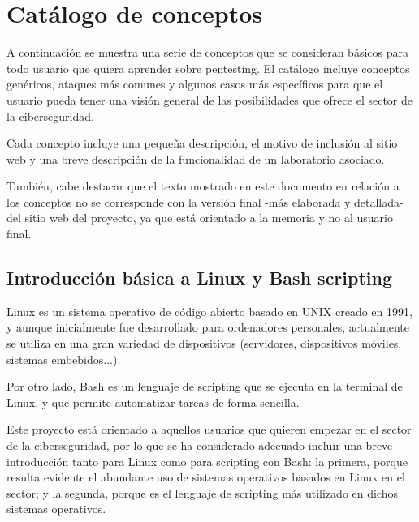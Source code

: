             \newpage
        
        
\chapter{Catálogo de conceptos}
    \label{sec:catalogo}

    A continuación se muestra una serie de conceptos que se consideran básicos para todo usuario que quiera aprender sobre pentesting. El catálogo incluye conceptos genéricos, ataques más comunes y algunos casos más específicos para que el usuario pueda tener una visión general de las posibilidades que ofrece el sector de la ciberseguridad.

    Cada concepto incluye una pequeña descripción, el motivo de inclusión al sitio web y una breve descripción de la funcionalidad de un laboratorio asociado.

    También, cabe destacar que el texto mostrado en este documento en relación a los conceptos no se corresponde con la versión final -más elaborada y detallada- del sitio web del proyecto, ya que está orientado a la memoria y no al usuario final.

    \section{Introducción básica a Linux y Bash scripting}
        \label{sec:catalogo-linux-bash}

        Linux es un sistema operativo de código abierto basado en UNIX creado en 1991, y aunque inicialmente fue desarrollado para ordenadores personales, actualmente se utiliza en una gran variedad de dispositivos (servidores, dispositivos móviles, sistemas embebidos...).

        Por otro lado, Bash es un lenguaje de scripting que se ejecuta en la terminal de Linux, y que permite automatizar tareas de forma sencilla.

        Este proyecto está orientado a aquellos usuarios que quieren empezar en el sector de la ciberseguridad, por lo que se ha considerado adecuado incluir una breve introducción tanto para Linux como para scripting con Bash: la primera, porque resulta evidente el abundante uso de sistemas operativos basados en Linux en el sector; y la segunda, porque es el lenguaje de scripting más utilizado en dichos sistemas operativos.

